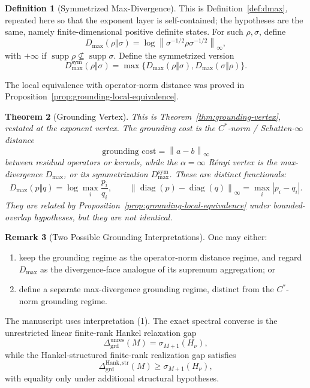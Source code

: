 \documentclass[12pt]{article}
\newtheorem{theorem}{Theorem}[section]
\theoremstyle{definition}
\newtheorem{definition}[theorem]{Definition}
\newtheorem{remark}[theorem]{Remark}
\DeclareMathOperator{\supp}{supp}
\newcommand{\norm}[1]{\left\lVert#1\right\rVert}
\newcommand{\Dunres}{\Delta_{\mathrm{grd}}^{\mathrm{unres}}}
\newcommand{\DHankstr}{\Delta_{\mathrm{grd}}^{\mathrm{Hank,str}}}
\newcommand{\Dmax}{D_{\max}}
\newcommand{\Dmaxsym}{D_{\max}^{\mathrm{sym}}}
\begin{document}
\begin{definition}[Symmetrized Max-Divergence]
\label{def:dmax-exponent}
This is Definition~\ref{def:dmax}, repeated here so that the exponent layer is
self-contained; the hypotheses are the same, namely finite-dimensional positive
definite states.  For such $\rho,\sigma$, define
\[
\Dmax(\rho\Vert\sigma)
=
\log
\left\|
\sigma^{-1/2}\rho\sigma^{-1/2}
\right\|_\infty,
\]
with $+\infty$ if $\supp\rho\not\subseteq\supp\sigma$.  Define the
symmetrized version
\[
\Dmaxsym(\rho\Vert\sigma)
=
\max\{
\Dmax(\rho\Vert\sigma),
\Dmax(\sigma\Vert\rho)
\}.
\]
\end{definition}

The local equivalence with operator-norm distance was proved in
Proposition~\ref{prop:grounding-local-equivalence}.

\begin{theorem}[Grounding Vertex]
\label{thm:grounding-alpha-infty}
This is Theorem~\ref{thm:grounding-vertex}, restated at the exponent vertex.
The grounding cost is the $C^*$-norm / Schatten-$\infty$ distance
\[
\text{grounding cost}
=
\norm{a-b}_\infty
\]
between residual operators or kernels, while the $\alpha=\infty$ R\'enyi vertex
is the max-divergence $\Dmax$, or its symmetrization $\Dmaxsym$.  These are
distinct functionals:
\[
\Dmax(p\Vert q)
=
\log\max_i\frac{p_i}{q_i},
\qquad
\norm{\operatorname{diag}(p)-\operatorname{diag}(q)}_\infty
=
\max_i|p_i-q_i|.
\]
They are related by Proposition~\ref{prop:grounding-local-equivalence} under
bounded-overlap hypotheses, but they are not identical.
\end{theorem}

\begin{remark}[Two Possible Grounding Interpretations]
\label{rem:grounding-interpretations}
One may either:
\begin{enumerate}[label=(\arabic*)]
\item keep the grounding regime as the operator-norm distance regime, and
regard $\Dmax$ as the divergence-face analogue of its supremum
aggregation; or
\item define a separate max-divergence grounding regime, distinct from the
$C^*$-norm grounding regime.
\end{enumerate}
The manuscript uses interpretation (1).  The exact spectral converse is the
unrestricted linear finite-rank Hankel relaxation gap
\[
\Dunres(M)=\sigma_{M+1}(H_\nu),
\]
while the Hankel-structured finite-rank realization gap satisfies
\[
\DHankstr(M)\ge\sigma_{M+1}(H_\nu),
\]
with equality only under additional structural hypotheses.
\end{remark}
\end{document}
